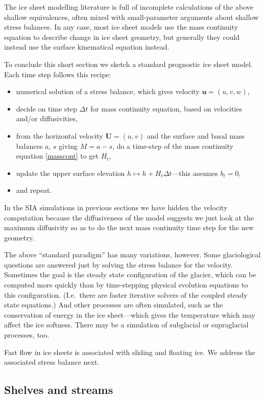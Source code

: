 \documentclass[titlepage,letterpaper,final,12pt]{scrartcl}
\begin{document}
The ice sheet modelling literature is full of incomplete calculations of the above shallow equivalences, often mixed with small-parameter arguments about shallow stress balances.  In any case, most ice sheet models use the mass continuity equation to describe change in ice sheet geometry, but generally they could instead use the surface kinematical equation instead.  

To conclude this short section we sketch a standard prognostic ice sheet model.  Each time step follows this recipe:
  \begin{itemize}
  \item numerical solution of a stress balance, which gives velocity $\mathbf{u}=(u,v,w)$,
  \item decide on time step $\Delta t$ for mass continuity equation, based on velocities and/or diffusivities,
  \item from the horizontal velocity $\mathbf{U}=(u,v)$ and the surface and basal mass balances $a$, $s$ giving $M=a-s$, do a time-step of the mass continuity equation \eqref{masscont} to get $H_t$,
  \item update the upper surface elevation $h \mapsto h + H_t \Delta t$---this assumes $b_t=0$,
  \item and repeat.
  \end{itemize}
In the SIA simulations in previous sections we have hidden the velocity computation because the diffusiveness of the model suggests we just look at the maximum diffusivity so as to do the next mass continuity time step for the new geometry.

The above ``standard paradigm'' has many variations, however.  Some glaciological questions are answered just by solving the stress balance for the velocity.  Sometimes the goal is the steady state configuration of the glacier, which can be computed more quickly than by time-stepping physical evolution equations to this configuration.  (I.e.~there are faster iterative solvers of the coupled steady state equations.)  And other processes are often simulated, such as the conservation of energy in the ice sheet---which gives the temperature which may affect the ice softness.  There may be a simulation of subglacial or supraglacial processes, too.

Fast flow in ice sheets is associated with sliding and floating ice.  We address the associated stress balance next.

\subsection{Shelves and streams}
\end{document}
